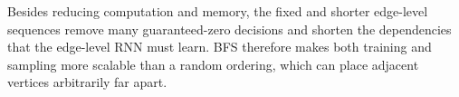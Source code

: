\begin{solution}
\begin{enumerate}[label=\textbf{\arabic*.},leftmargin=*]
    Besides reducing computation and memory, the fixed and shorter
    edge-level sequences remove many guaranteed-zero decisions and shorten
    the dependencies that the edge-level RNN must learn.  BFS therefore makes
    both training and sampling more scalable than a random ordering, which
    can place adjacent vertices arbitrarily far apart.
\end{enumerate}
\end{solution}
